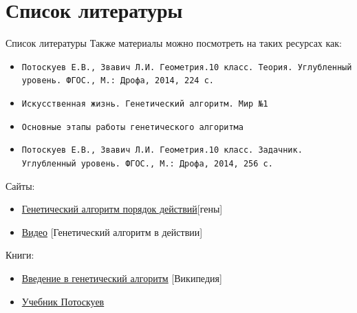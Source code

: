 \documentclass[professionalfonts, aspectratio=169]{beamer}
\begin{document}
\section{Список литературы}
\begin{frame}{Список литературы}
Также материалы можно посмотреть на таких ресурсах как:
\begin{block}{}
  \begin{itemize}
    \item {\tt Потоскуев Е.В., Звавич Л.И. Геометрия.10 класс. Теория. Углубленный уровень. ФГОС., М.: Дрофа, 2014, 224 с.}
    \item {\tt Искусственная жизнь. Генетический алгоритм. Мир №1}
    \item {\tt Основные этапы работы генетического алгоритма}
        \item {\tt Потоскуев Е.В., Звавич Л.И. Геометрия.10 класс. Задачник. Углубленный уровень. ФГОС., М.: Дрофа, 2014, 256 с.}
  	\end{itemize}
	\end{block}
	
Сайты:
\begin{itemize}
    \item \href{https://neurohive.io/ru/osnovy-data-science/chto-takoe-geneticheskie-algoritmy/}{Генетический алгоритм порядок действий}[гены]
    \item \href{https://www.youtube.com/watch?v=ttsZV01aYYU}{Видео} [Генетический алгоритм в действии]
\end{itemize}

Книги:
\begin{itemize}
    \item \href{https://ru.wikipedia.org/wiki/Генетический_алгоритм#История}{Введение в генетический алгоритм} [Википедия]
    \item \href{https://www.labirint.ru/authors/59292/}{Учебник Потоскуев} 

\end{itemize}
\end{frame}
\end{document}
